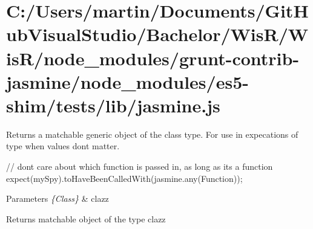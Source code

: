 \hypertarget{_c_1_2_users_2martin_2_documents_2_git_hub_visual_studio_2_bachelor_2_wis_r_2_wis_r_2node_moduledf1d3fccefe076e7cba2c20deacf125a}{}\section{C\+:/\+Users/martin/\+Documents/\+Git\+Hub\+Visual\+Studio/\+Bachelor/\+Wis\+R/\+Wis\+R/node\+\_\+modules/grunt-\/contrib-\/jasmine/node\+\_\+modules/es5-\/shim/tests/lib/jasmine.\+js}
Returns a matchable \textquotesingle{}generic\textquotesingle{} object of the class type. For use in expecations of type when values don\textquotesingle{}t matter.

// don\textquotesingle{}t care about which function is passed in, as long as it\textquotesingle{}s a function expect(my\+Spy).to\+Have\+Been\+Called\+With(jasmine.\+any(\+Function));


\begin{DoxyParams}{Parameters}
{\em \{\+Class\}} & clazz \\
\hline
\end{DoxyParams}
\begin{DoxyReturn}{Returns}
matchable object of the type clazz
\end{DoxyReturn}

